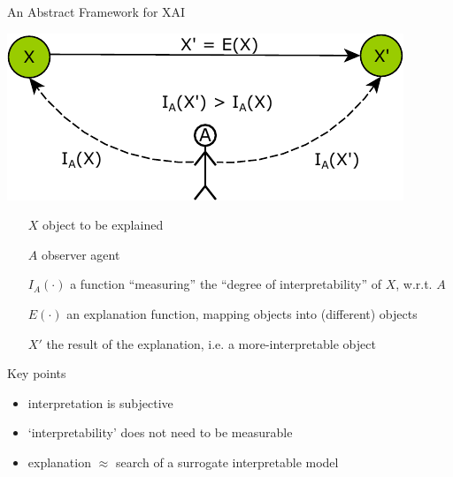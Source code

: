 \documentclass[presentation]{beamer}\mode<presentation>{\usetheme{AMSBolognaFC}}
\begin{document}
\begin{frame}[allowframebreaks]{An Abstract Framework for XAI}

    \begin{center}
        \includegraphics[width=.5\linewidth]{figures/framework.pdf}
    \end{center}
    \begin{itemize}
        \item[$X$] object to be explained
        \item[$A$] observer agent
        \item[$I_A(\cdot)$] a function ``measuring'' the ``degree of interpretability'' of $X$, w.r.t. $A$
        \item[$E(\cdot)$] an \alert{explanation} function, mapping objects into (different) objects      
        \item[$X'$] the \alert{result} of the explanation, i.e. a \alert{more-interpretable} object
    \end{itemize}
    
    \begin{block}{Key points}
        \begin{itemize}
            \item interpretation is \alert{subjective}
            \item `interpretability' does not need to be measurable
            \item explanation $\approx$ search of a \alert{surrogate} interpretable model
        \end{itemize}
    \end{block}
\end{frame}
\end{document}
